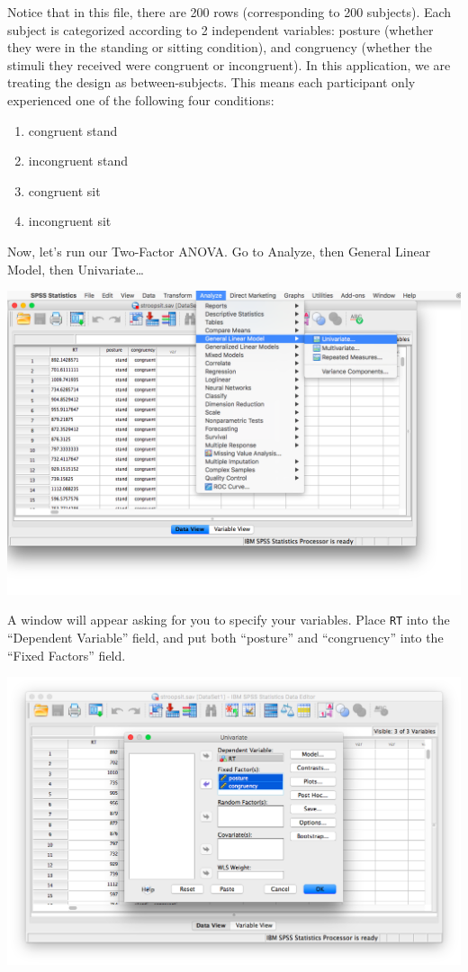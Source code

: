 \documentclass[
]{book}
\providecommand{\tightlist}{%
  \setlength{\itemsep}{0pt}\setlength{\parskip}{0pt}}
\begin{document}
Notice that in this file, there are 200 rows (corresponding to 200 subjects). Each subject is categorized according to 2 independent variables: posture (whether they were in the standing or sitting condition), and congruency (whether the stimuli they received were congruent or incongruent). In this application, we are treating the design as between-subjects. This means each participant only experienced one of the following four conditions:

\begin{enumerate}
\def\labelenumi{\arabic{enumi}.}
\tightlist
\item
  congruent stand
\item
  incongruent stand
\item
  congruent sit
\item
  incongruent sit
\end{enumerate}

Now, let's run our Two-Factor ANOVA. Go to {Analyze}, then {General Linear Model}, then {Univariate\ldots{}}

\includegraphics{img/10.4.12.png}

A window will appear asking for you to specify your variables. Place \texttt{RT} into the ``Dependent Variable'' field, and put both ``posture'' and ``congruency'' into the ``Fixed Factors'' field.

\includegraphics{img/10.4.13.png}
\end{document}
